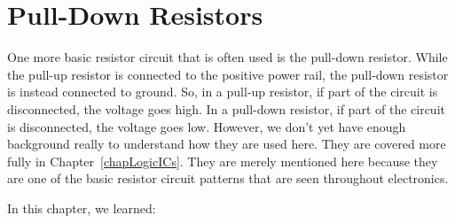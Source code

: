 \section{Pull-Down Resistors}

One more basic resistor circuit that is often used is the pull-down resistor.
While the pull-up resistor is connected to the positive power rail, the pull-down resistor is instead connected to ground.
So, in a pull-up resistor, if part of the circuit is disconnected, the voltage goes high.
In a pull-down resistor, if part of the circuit is disconnected, the voltage goes low.
However, we don't yet have enough background really to understand how they are used here.
They are covered more fully in Chapter~\ref{chapLogicICs}.
They are merely mentioned here because they are one of the basic resistor circuit patterns that are seen throughout electronics.

\reviewsection

In this chapter, we learned:

